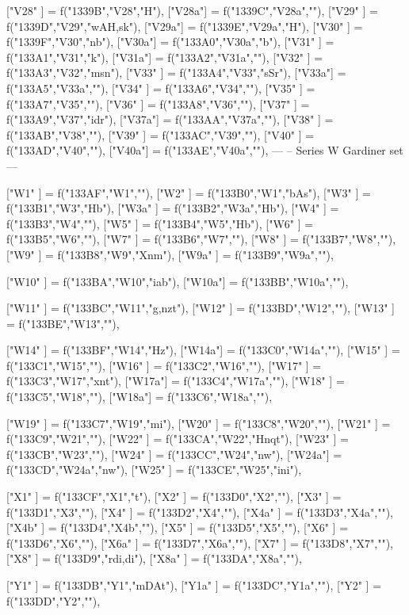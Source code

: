{["V28" ]    = f("1339B","V28","H"),
["V28a"]    = f("1339C","V28a",""),
["V29" ]    = f("1339D","V29","wAH,sk"),
["V29a"]    = f("1339E","V29a","H"),
["V30" ]    = f("1339F","V30","nb"),
["V30a"]    = f("133A0","V30a","b"),
["V31" ]    = f("133A1","V31","k"),
["V31a"]    = f("133A2","V31a",""),
["V32" ]    = f("133A3","V32","msn"),
["V33" ]    = f("133A4","V33","sSr"),
["V33a"]    = f("133A5","V33a",""),
["V34" ]    = f("133A6","V34",""),
["V35" ]    = f("133A7","V35",""),
["V36" ]    = f("133A8","V36",""),
["V37" ]    = f("133A9","V37","idr"),
["V37a"]    = f("133AA","V37a",""),
["V38" ]    = f("133AB","V38",""),
["V39" ]    = f("133AC","V39",""),
["V40" ]    = f("133AD","V40",""),
["V40a"]    = f("133AE","V40a",""),
---
--  Series W Gardiner set
---

["W1"  ]  = f("133AF","W1",""),
["W2"  ]  = f("133B0","W1","bAs"),
["W3"  ]  = f("133B1","W3","Hb"),
["W3a" ]  = f("133B2","W3a","Hb"),
["W4"  ]  = f("133B3","W4",""),
["W5"  ]  = f("133B4","W5","Hb"),
["W6"  ]  = f("133B5","W6",""),
["W7"  ]  = f("133B6","W7",""),
["W8"  ]  = f("133B7","W8",""),
["W9"  ]  = f("133B8","W9","Xnm"),
["W9a" ]  = f("133B9","W9a",""),

["W10" ]  = f("133BA","W10","iab"),
["W10a"]  = f("133BB","W10a",""),

["W11" ]  = f("133BC","W11","g,nzt"),
["W12" ]  = f("133BD","W12",""),
["W13" ]  = f("133BE","W13",""),

["W14" ]  = f("133BF","W14","Hz"),
["W14a"]  = f("133C0","W14a",""),
["W15" ]  = f("133C1","W15",""),
["W16" ]  = f("133C2","W16",""),
["W17" ]  = f("133C3","W17","xnt"),
["W17a"]  = f("133C4","W17a",""),
["W18" ]  = f("133C5","W18",""),
["W18a"]  = f("133C6","W18a",""),

["W19" ]  = f("133C7","W19","mi"),
["W20" ]  = f("133C8","W20",""),
["W21" ]  = f("133C9","W21",""),
["W22" ]  = f("133CA","W22","Hnqt"),
["W23" ]  = f("133CB","W23",""),
["W24" ]  = f("133CC","W24","nw"),
["W24a"]  = f("133CD","W24a","nw"),
["W25" ]  = f("133CE","W25","ini"),

["X1"  ]    = f("133CF","X1","t"),
  ["X2"  ]    = f("133D0","X2",""),
  ["X3"  ]    = f("133D1","X3",""),
  ["X4"  ]    = f("133D2","X4",""),
  ["X4a" ]    = f("133D3","X4a",""),
  ["X4b" ]    = f("133D4","X4b",""),
  ["X5"  ]    = f("133D5","X5",""),
  ["X6"  ]    = f("133D6","X6",""),
  ["X6a" ]    = f("133D7","X6a",""),
  ["X7"  ]    = f("133D8","X7",""),
["X8"  ]    = f("133D9","rdi,di"),
  ["X8a" ]    = f("133DA","X8a",""),

["Y1"  ]    = f("133DB","Y1","mDAt"),
["Y1a" ]    = f("133DC","Y1a",""),
  ["Y2"  ]    = f("133DD","Y2",""),

}
